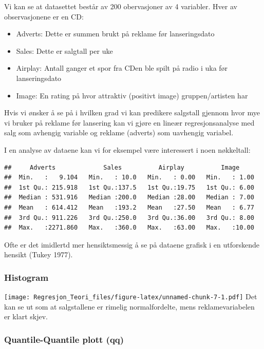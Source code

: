 \documentclass[
]{article}
\providecommand{\tightlist}{%
  \setlength{\itemsep}{0pt}\setlength{\parskip}{0pt}}
\begin{document}
Vi kan se at datasettet består av 200 obervasjoner av 4 variabler. Hver
av observasjonene er en CD:

\begin{itemize}
\tightlist
\item
  Adverts: Dette er summen brukt på reklame før lanseringsdato
\item
  Sales: Dette er salgtall per uke
\item
  Airplay: Antall ganger et spor fra CDen ble spilt på radio i uka før
  lanseringsdato
\item
  Image: En rating på hvor attraktiv (positivt image) gruppen/artisten
  har
\end{itemize}

Hvis vi ønsker å se på i hvilken grad vi kan predikere salgstall gjennom
hvor mye vi bruker på reklame før lansering kan vi gjøre en lineær
regresjonsanalyse med salg som avhengig variable og reklame (adverts)
som uavhengig variabel.

I en analyse av dataene kan vi for eksempel være interessert i noen
nøkkeltall:

\begin{verbatim}
##     Adverts             Sales          Airplay          Image      
##  Min.   :   9.104   Min.   : 10.0   Min.   : 0.00   Min.   : 1.00  
##  1st Qu.: 215.918   1st Qu.:137.5   1st Qu.:19.75   1st Qu.: 6.00  
##  Median : 531.916   Median :200.0   Median :28.00   Median : 7.00  
##  Mean   : 614.412   Mean   :193.2   Mean   :27.50   Mean   : 6.77  
##  3rd Qu.: 911.226   3rd Qu.:250.0   3rd Qu.:36.00   3rd Qu.: 8.00  
##  Max.   :2271.860   Max.   :360.0   Max.   :63.00   Max.   :10.00
\end{verbatim}

Ofte er det imidlertd mer hensiktsmessig å se på dataene grafisk i en
utforskende hensikt (Tukey 1977).

\hypertarget{histogram}{%
\subsubsection{Histogram}\label{histogram}}

\texttt{[image: Regresjon\_Teori\_files/figure-latex/unnamed-chunk-7-1.pdf]}
Det kan se ut som at salgstallene er rimelig normalfordelte, mens
reklamevariabelen er klart skjev.

\hypertarget{quantile-quantile-plott-qq}{%
\subsubsection{Quantile-Quantile plott
(qq)}\label{quantile-quantile-plott-qq}}
\end{document}
